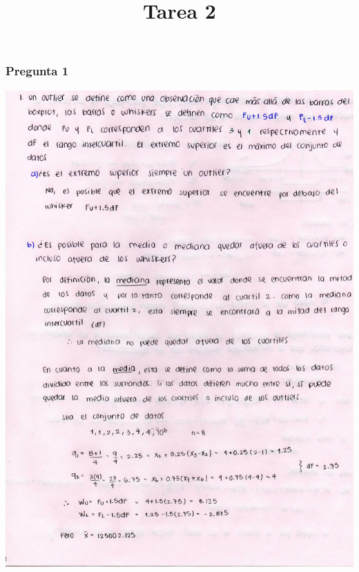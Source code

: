 \documentclass[
]{article}
\title{Tarea 2}
\author{}
\date{\vspace{-2.5em}}
\begin{document}
\maketitle

\hypertarget{pregunta-1}{%
\subsubsection{\texorpdfstring{\textbf{Pregunta
1}}{Pregunta 1}}\label{pregunta-1}}

\includegraphics{1a.jpg}
\end{document}
